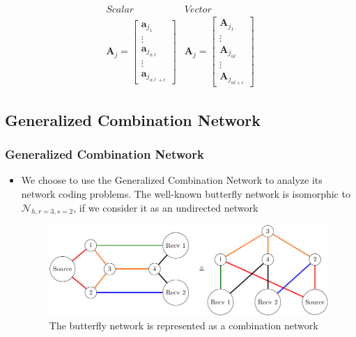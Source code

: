 \documentclass[c]{beamer}
\begin{document}
\begin{frame}[c]
\begin{itemize}
			\[
			\begin{array}{c|c}
			Scalar & Vector\\
			\boldsymbol{A}_{j}=\left[\begin{array}{c}
			\boldsymbol{a}_{j_{1}}\\
			\vdots\\
			\boldsymbol{a}_{j_{\alpha\ell}}\\
			\vdots\\
			\boldsymbol{a}_{j_{\alpha\ell+\epsilon}}
			\end{array}\right] & \boldsymbol{A}_{j}=\left[\begin{array}{c}
			\boldsymbol{A}_{j_{1}}\\
			\vdots\\
			\boldsymbol{A}_{j_{\alpha l}}\\
			\vdots\\
			\boldsymbol{A}_{j_{\alpha l+\epsilon}}
			\end{array}\right]
			\end{array}
			\]		
	\end{itemize}	
\end{frame}

\subsection{Generalized Combination Network}
\begin{frame}[c]
\frametitle{Generalized Combination Network}

	\begin{itemize}
		\item We choose to use the Generalized Combination Network to analyze its network coding problems. The well-known butterfly network is isomorphic to $\mathcal{N}_{h,r=3,s=2}$, if we consider it as
an undirected network \cite{Maheshwar:2012}
			\begin{figure}[H]
			\caption{The butterfly network is represented as a combination network \label{fig:butterfly_nw_cn}}
			
			\centering{}\includegraphics[width=0.5\paperwidth]{../figures/ahlswede_butterfly_network_CN}
			\end{figure}
	\end{itemize}

\end{frame}
\end{document}
